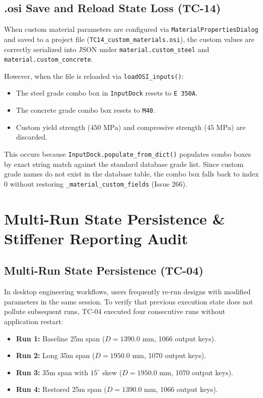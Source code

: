 \documentclass[11pt,a4paper]{article}
\begin{document}
\subsection{.osi Save and Reload State Loss (TC-14)}
When custom material parameters are configured via \texttt{MaterialPropertiesDialog} and saved to a project file (\texttt{TC14\_custom\_materials.osi}), the custom values are correctly serialized into JSON under \texttt{material.custom\_steel} and \texttt{material.custom\_concrete}.

However, when the file is reloaded via \texttt{loadOSI\_inputs()}:
\begin{itemize}
    \item The steel grade combo box in \texttt{InputDock} resets to \texttt{E 350A}.
    \item The concrete grade combo box resets to \texttt{M40}.
    \item Custom yield strength ($450\text{ MPa}$) and compressive strength ($45\text{ MPa}$) are discarded.
\end{itemize}
This occurs because \texttt{InputDock.populate\_from\_dict()} populates combo boxes by exact string match against the standard database grade list. Since custom grade names do not exist in the database table, the combo box falls back to index 0 without restoring \texttt{\_material\_custom\_fields} (Issue 266).

\section{Multi-Run State Persistence \& Stiffener Reporting Audit}

\subsection{Multi-Run State Persistence (TC-04)}
In desktop engineering workflows, users frequently re-run designs with modified parameters in the same session. To verify that previous execution state does not pollute subsequent runs, TC-04 executed four consecutive runs without application restart:
\begin{itemize}
    \item \textbf{Run 1:} Baseline 25m span ($D = 1390.0\text{ mm}$, 1066 output keys).
    \item \textbf{Run 2:} Long 35m span ($D = 1950.0\text{ mm}$, 1070 output keys).
    \item \textbf{Run 3:} 35m span with $15^\circ$ skew ($D = 1950.0\text{ mm}$, 1070 output keys).
    \item \textbf{Run 4:} Restored 25m span ($D = 1390.0\text{ mm}$, 1066 output keys).
\end{itemize}
\end{document}
